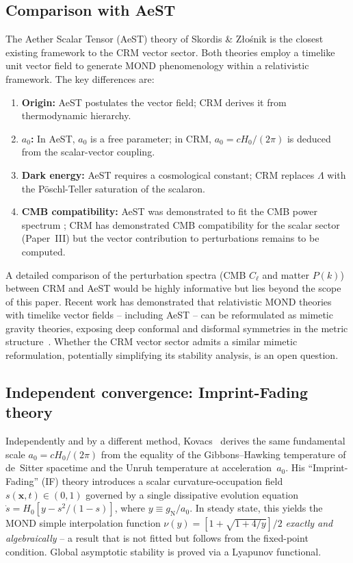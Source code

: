 \documentclass[aps,prd,twocolumn,superscriptaddress,nofootinbib]{revtex4-2}
\begin{document}
\subsection{Comparison with AeST}

The Aether Scalar Tensor (AeST) theory of Skordis \& Z{\l}o\'snik \cite{Skordis2021} is the closest existing framework to the CRM vector sector. Both theories employ a timelike unit vector field to generate MOND phenomenology within a relativistic framework. The key differences are:

\begin{enumerate}
\item \textbf{Origin:} AeST postulates the vector field; CRM derives it from thermodynamic hierarchy.
\item \textbf{$a_0$:} In AeST, $a_0$ is a free parameter; in CRM, $a_0 = cH_0/(2\pi)$ is deduced from the scalar-vector coupling.
\item \textbf{Dark energy:} AeST requires a cosmological constant; CRM replaces $\Lambda$ with the P\"oschl-Teller saturation of the scalaron.
\item \textbf{CMB compatibility:} AeST was demonstrated to fit the CMB power spectrum \cite{Skordis2021}; CRM has demonstrated CMB compatibility for the scalar sector (Paper~III) but the vector contribution to perturbations remains to be computed.
\end{enumerate}

A detailed comparison of the perturbation spectra (CMB $C_\ell$ and matter $P(k)$) between CRM and AeST would be highly informative but lies beyond the scope of this paper. Recent work has demonstrated that relativistic MOND theories with timelike vector fields -- including AeST -- can be reformulated as mimetic gravity theories, exposing deep conformal and disformal symmetries in the metric structure~\cite{DomenechGanz2025}. Whether the CRM vector sector admits a similar mimetic reformulation, potentially simplifying its stability analysis, is an open question.

\subsection{Independent convergence: Imprint-Fading theory}

Independently and by a different method, Kovacs~\cite{Kovacs2026} derives the same fundamental scale $a_0 = cH_0/(2\pi)$ from the equality of the Gibbons--Hawking temperature of de~Sitter spacetime and the Unruh temperature at acceleration~$a_0$. His ``Imprint-Fading'' (IF) theory introduces a scalar curvature-occupation field $s(\mathbf{x},t) \in (0,1)$ governed by a single dissipative evolution equation $\dot{s} = H_0[y - s^2/(1-s)]$, where $y \equiv g_\mathrm{N}/a_0$. In steady state, this yields the MOND simple interpolation function $\nu(y) = [1 + \sqrt{1+4/y}]/2$ \emph{exactly and algebraically} -- a result that is not fitted but follows from the fixed-point condition. Global asymptotic stability is proved via a Lyapunov functional.
\end{document}
